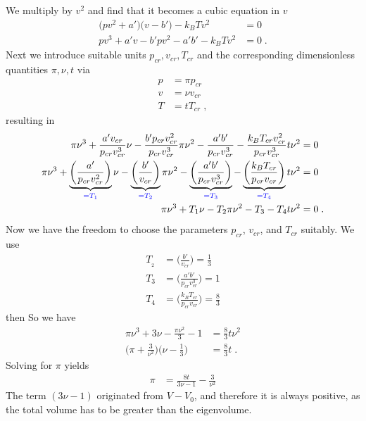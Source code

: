 We multiply  by $v^{2}$ and find that it becomes a cubic equation in $v$
%
\begin{align*}
\bigg( p v^{2}+ a' \bigg)\bigg(v -  b' \bigg) - k_{B} T v^{2}&= 0\\
p v^{3} + a' v   -  b' p v^{2} - a' b' - k_{B} T v^{2}&= 0\;.
\end{align*}
%
Next we introduce suitable units $p_{cr},v_{cr},T_{cr}$ and the corresponding dimensionless 
quantities $\pi,\nu,t$ via
%
\begin{align*}
p &=\pi p_{cr}\\
v &=\nu v_{cr}\\
T &= t T_{cr}\;,
\end{align*}
%
resulting in 
%
\begin{align*}
\pi \nu^{3} + \frac{a' v_{cr}}{p_{cr} v_{cr}^{3} } \nu -\frac{b' p_{cr}  v_{cr}^{2}}{p_{cr} v_{cr}^{3} } \pi \nu^{2}
-\frac{a'b'}{p_{cr} v_{cr}^{3} } - \frac{k_{B}T_{cr} v_{cr}^{2}}{p_{cr} v_{cr}^{3} } t \nu^{2}&=0 \\
\pi \nu^{3} + \underbrace{
\bigg(\frac{a' }{p_{cr} v_{cr}^{2} }\bigg) 
}_{\color{blue} = T_{1}}\nu
 -\underbrace{
\bigg(\frac{b'  }{ v_{cr} }\bigg) 
}_{\color{blue} = T_{2}}\pi \nu^{2}
-\underbrace{
\bigg(\frac{a'b'}{p_{cr} v_{cr}^{3} }\bigg)
}_{\color{blue} = T_{3}} - 
\underbrace{
\bigg(\frac{k_{B}T_{cr} }{p_{cr} v_{cr} } \bigg)
}_{\color{blue} = T_{4}}
t \nu^{2}&=0 \\
\pi \nu^{3} + T_{1}\nu - T_{2} \pi \nu^{2}
-T_{3} - T_{4} t \nu^{2}&=0 \;.
\end{align*}
%
Now we have the freedom to choose the parameters $p_{cr}$, $v_{cr}$, and $T_{cr}$ suitably.
We use
%
\begin{align}
T_{_{2}} &=\bigg(\frac{b'  }{ v_{cr} }\bigg)= \frac{1}{3}\\
T_{3}&= \bigg(\frac{a'b'}{p_{cr} v_{cr}^{3} }\bigg) =1\\
T_{4}&=\bigg(\frac{k_{B}T_{cr} }{p_{cr} v_{cr} } \bigg)= \frac{8}{3}
\end{align}
%
then
%
So we have
%
\begin{align}\label{eq:auxaux}
\pi \nu^{3} + 3 \nu -  \frac{\pi \nu^{2}}{3} - 1 &= \frac{8}{3}t \nu^{2}\\
\bigg( \pi + \frac{3}{\nu^{2}} \bigg)\bigg( \nu - \frac{1}{3} \bigg) &=\frac{8}{3} t\;.
\end{align}
%
Solving for $\pi$ yields
%
\begin{align*}
\pi &= \frac{8t}{3 \nu-1 } - \frac{3}{\nu^{2}}
\end{align*}
%
The term $(3\nu-1)$ originated from $V-V_{0}$, and therefore it is always positive,
as the total volume has to be greater than the eigenvolume. 

